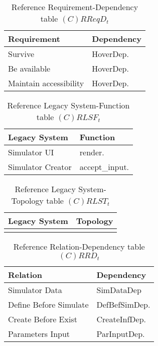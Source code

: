 \begin{table}[H]
	\centering
	\begin{tabular}{|p{4cm}|p{8cm}|}
			\hline
			\textbf{Requirement} & \textbf{Dependency} \\
			\hline
			Survive & HoverDep. \\
			\hline
			Be available & HoverDep. \\
			\hline
			Maintain accessibility & HoverDep. \\
			\hline
		\end{tabular}
		\caption{Reference Requirement-Dependency table $(C)RReqD_t$}
	\label{tab:crreqdt}
\end{table}

\begin{table}[H]
	\centering
	\begin{tabular}{|p{4cm}|p{8cm}|}
			\hline
			\textbf{Legacy System} & \textbf{Function} \\
			\hline
			Simulator UI & render. \\
			\hline
			Simulator Creator & accept\_input. \\
			\hline
		\end{tabular}
	\caption{Reference Legacy System-Function table $(C)RLSF_t$}
	\label{tab:crlsft}
\end{table}

\begin{table}[H]
	\centering
	\begin{tabular}{|p{4cm}|p{8cm}|}
			\hline
			\textbf{Legacy System} & \textbf{Topology} \\
			\hline
			& \\
			\hline
		\end{tabular}
	\caption{Reference Legacy System-Topology table $(C)RLST_t$}
	\label{tab:crlsTt}
\end{table}

\begin{table}[H]
	\centering
	\begin{tabular}{|p{4cm}|p{8cm}|}
			\hline
			\textbf{Relation} & \textbf{Dependency} \\
			\hline
			Simulator Data & SimDataDep \\
			\hline
			Define Before Simulate & DefBefSimDep. \\
			\hline
			Create Before Exist & CreateInfDep. \\
			\hline
			Parameters Input & ParInputDep. \\
			\hline
		\end{tabular}
	\caption{Reference Relation-Dependency table $(C)RRD_t$}
	\label{tab:crrdt}
\end{table}

